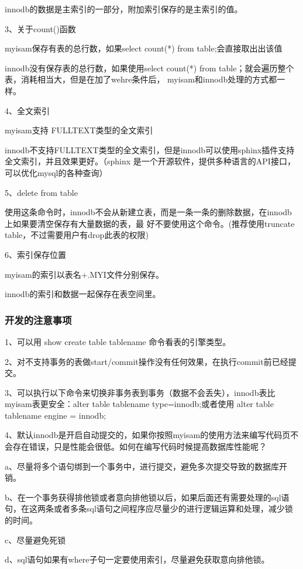 \documentclass[UTF8]{ctexart}
\begin{document}
innodb的数据是主索引的一部分，附加索引保存的是主索引的值。

3、关于count()函数

myisam保存有表的总行数，如果select count(*) from table;会直接取出出该值

innodb没有保存表的总行数，如果使用select count(*) from table；就会遍历整个表，消耗相当大，但是在加了wehre条件后，
myisam和innodb处理的方式都一样。

4、全文索引

myisam支持 FULLTEXT类型的全文索引

innodb不支持FULLTEXT类型的全文索引，但是innodb可以使用sphinx插件支持全文索引，并且效果更好。（sphinx   是一个开源软件，提供多种语言的API接口，可以优化mysql的各种查询）

5、delete from table

使用这条命令时，innodb不会从新建立表，而是一条一条的删除数据，在innodb上如果要清空保存有大量数据的表，最       好不要使用这个命令。(推荐使用truncate table，不过需要用户有drop此表的权限)

6、索引保存位置

myisam的索引以表名+.MYI文件分别保存。

innodb的索引和数据一起保存在表空间里。

\subsubsection{开发的注意事项}

1、可以用 show create table tablename 命令看表的引擎类型。

2、对不支持事务的表做start/commit操作没有任何效果，在执行commit前已经提交。

3、可以执行以下命令来切换非事务表到事务（数据不会丢失），innodb表比myisam表更安全：alter table tablename type=innodb;或者使用 alter table tablename engine = innodb;

4、默认innodb是开启自动提交的，如果你按照myisam的使用方法来编写代码页不会存在错误，只是性能会很低。如何在编写代码时候提高数据库性能呢？

a、尽量将多个语句绑到一个事务中，进行提交，避免多次提交导致的数据库开销。

b、在一个事务获得排他锁或者意向排他锁以后，如果后面还有需要处理的sql语句，在这两条或者多条sql语句之间程序应尽量少的进行逻辑运算和处理，减少锁的时间。

c、尽量避免死锁

d、sql语句如果有where子句一定要使用索引，尽量避免获取意向排他锁。
\end{document}
